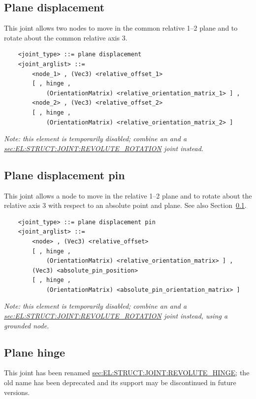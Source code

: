 \subsection{Plane displacement}\label{sec:EL:STRUCT:JOINT:PLANE_DISPLACEMENT}
This joint allows two nodes to move in the common relative 1--2 plane 
and to rotate about the common relative axis 3.
\begin{verbatim}
    <joint_type> ::= plane displacement
    <joint_arglist> ::= 
        <node_1> , (Vec3) <relative_offset_1> 
        [ , hinge , 
            (OrientationMatrix) <relative_orientation_matrix_1> ] ,
        <node_2> , (Vec3) <relative_offset_2>
        [ , hinge , 
            (OrientationMatrix) <relative_orientation_matrix_2> ]
\end{verbatim}
\emph{Note: this element is temporarily disabled;
combine an  and a
\hyperref{\kw{revolute rotation}}{\kw{revolute rotation} (see Section~}{)}{sec:EL:STRUCT:JOINT:REVOLUTE_ROTATION}
joint instead.}

\subsection{Plane displacement pin}
This joint allows a node to move in the relative 1--2 plane 
and to rotate about the relative axis 3 with respect to an absolute point 
and plane.
See also Section~\ref{sec:EL:STRUCT:JOINT:PLANE_DISPLACEMENT}.
\begin{verbatim}
    <joint_type> ::= plane displacement pin
    <joint_arglist> ::= 
        <node> , (Vec3) <relative_offset>
        [ , hinge , 
            (OrientationMatrix) <relative_orientation_matrix> ] ,
        (Vec3) <absolute_pin_position>
        [ , hinge , 
            (OrientationMatrix) <absolute_pin_orientation_matrix> ]
\end{verbatim}
\emph{Note: this element is temporarily disabled;
combine an  and a
\hyperref{\kw{revolute rotation}}{\kw{revolute rotation} (see Section~}{)}{sec:EL:STRUCT:JOINT:REVOLUTE_ROTATION}
joint instead, using a grounded node.}


\subsection{Plane hinge}
This joint has been renamed
\hyperref{\kw{revolute hinge}}{\kw{revolute hinge} (see Section~}{)}{sec:EL:STRUCT:JOINT:REVOLUTE_HINGE};
the old name has been deprecated and its support may be discontinued
in future versions.

